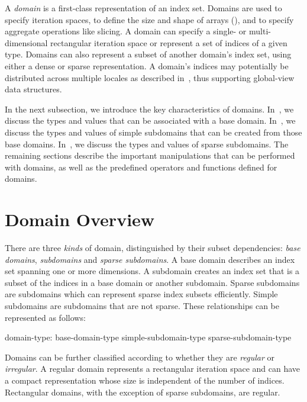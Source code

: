 \label{Domains}

A \emph{domain} is a first-class representation of an index set.
Domains are used to specify iteration spaces, to define the size and
shape of arrays (), and to specify aggregate operations
like slicing.
A domain can specify a single- or multi-dimensional
rectangular iteration space or represent a set of indices of
a given type.  Domains can also represent a subset of another domain's index set,
using either a dense or sparse representation.
A domain's
indices may potentially be distributed across multiple locales as
described in~, thus supporting global-view data
structures.

In the next subsection, we introduce the key characteristics of
domains.  In~, we discuss the types
and values that can be associated with a base domain.
In~, we discuss the types and
values of simple subdomains that can be created from those base
domains.  In~, we discuss the
types and values of sparse subdomains.  The remaining sections
describe the important manipulations that can be performed with
domains, as well as the predefined operators and functions defined for
domains.

\section{Domain Overview}

There are three \emph{kinds} of domain, distinguished by their subset
dependencies: \emph{base domains}, \emph{subdomains} and \emph{sparse
subdomains}.  A base domain describes an index set spanning one or more
dimensions.  A subdomain creates an index set that is a subset of the indices in
a base domain or another subdomain.  Sparse subdomains are subdomains which can
represent sparse index subsets efficiently.  Simple subdomains are subdomains
that are not sparse.  These relationships can be represented as follows:

\begin{syntax}
domain-type:
  base-domain-type
  simple-subdomain-type
  sparse-subdomain-type
\end{syntax}

Domains can be further classified according to whether they are \emph{regular}
or \emph{irregular}.  A regular domain represents a rectangular iteration
space and can have a compact representation whose size is independent
of the number of indices. Rectangular domains, with the exception of
sparse subdomains, are regular.

